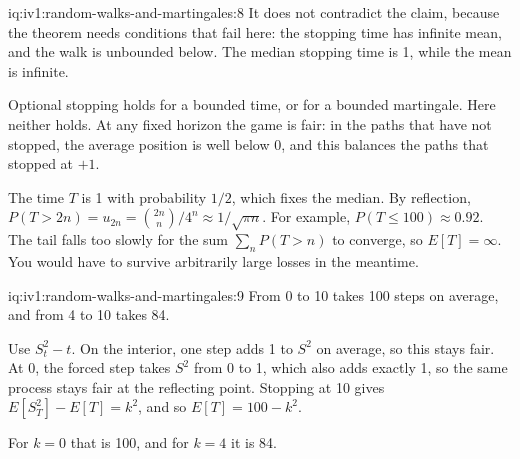 \begin{solution}{iq:iv1:random-walks-and-martingales:8}
It does not contradict the claim, because the theorem needs conditions that fail here: the stopping time has infinite mean, and the walk is unbounded below. The median stopping time is 1, while the mean is infinite.

Optional stopping holds for a bounded time, or for a bounded martingale. Here neither holds. At any fixed horizon the game is fair: in the paths that have not stopped, the average position is well below 0, and this balances the paths that stopped at $+1$.

The time $T$ is 1 with probability $1/2$, which fixes the median. By reflection, $P(T > 2n) = u_{2n} = \binom{2n}{n}/4^n \approx 1/\sqrt{\pi n}$. For example, $P(T \le 100) \approx 0.92$. The tail falls too slowly for the sum $\sum_n P(T > n)$ to converge, so $E[T] = \infty$. You would have to survive arbitrarily large losses in the meantime.

\end{solution}

\begin{solution}{iq:iv1:random-walks-and-martingales:9}
From 0 to 10 takes 100 steps on average, and from 4 to 10 takes 84.

Use $S_t^2 - t$. On the interior, one step adds 1 to $S^2$ on average, so this stays fair. At 0, the forced step takes $S^2$ from 0 to 1, which also adds exactly 1, so the same process stays fair at the reflecting point. Stopping at 10 gives $E[S_T^2] - E[T] = k^2$, and so $E[T] = 100 - k^2$.

For $k = 0$ that is 100, and for $k = 4$ it is 84.

\end{solution}

